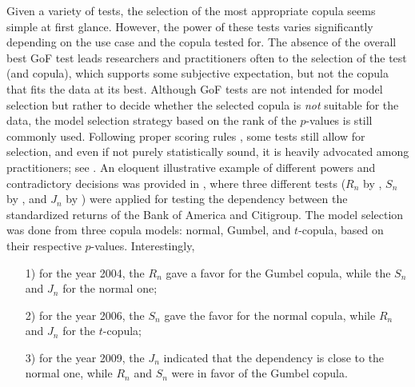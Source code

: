 Given a variety of tests, the selection of the most appropriate copula seems \mycolor simple at first glance. \bk However, the power of these tests varies significantly depending on the use case and the copula tested for. The absence of the overall best GoF test leads researchers and practitioners often to the selection of the test (and copula), which supports some subjective expectation, but not the copula that fits the data at its best. Although GoF tests are not intended for model selection but rather to decide whether the selected copula is \emph{not} suitable for the data, the model selection strategy based on the rank of the $p$-values is still commonly used. Following proper scoring rules \citep{gneiting2007strictly}, some tests still allow for selection, and even if not purely statistically sound, it is heavily advocated among practitioners; see \citet{de2014common}. An eloquent illustrative example of different powers and contradictory decisions was provided in \citet{zhang_okhrin_song_zhou_2016}, where three different tests ($R_n$ by \citet{zhang_okhrin_song_zhou_2016}, $S_n$ by \citet{genest_remillard_beaudoin_2009}, and $J_n$ by \citet{scaillet_2007}) were applied for testing the dependency between the standardized returns of the Bank of America and Citigroup. The model selection was done from three copula models: normal, Gumbel, and $t$-copula, based on their respective $p$-values. Interestingly,
\begin{itemize}
    \item[1)] for the year 2004, the $R_n$ gave a favor for the Gumbel copula, while the $S_n$ and $J_n$ for the normal one;
    \item[2)] for the year 2006, the $S_n$ gave the favor for the normal copula, while $R_n$ and $J_n$ for the $t$-copula;
    \item[3)] for the year 2009, the $J_n$ indicated that the dependency is close to the normal one, while $R_n$ and $S_n$ were in favor of the Gumbel copula.
\end{itemize}
